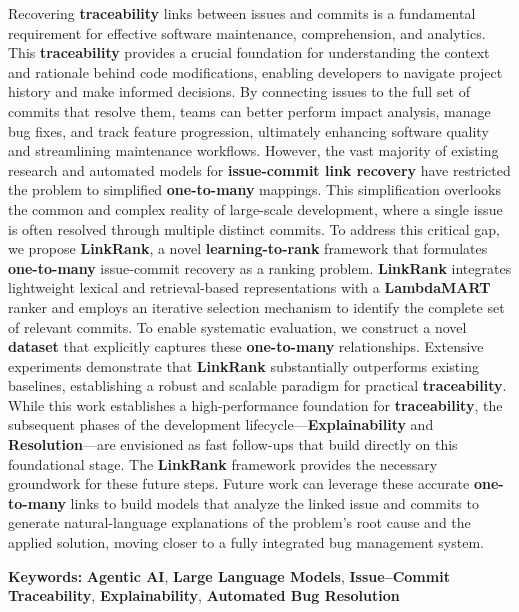 \documentclass[11pt,english,a4paper]{article}
\begin{document}
Recovering \textbf{traceability} links between issues and commits is a fundamental requirement for effective software maintenance, comprehension, and analytics. This \textbf{traceability} provides a crucial foundation for understanding the context and rationale behind code modifications, enabling developers to navigate project history and make informed decisions. By connecting issues to the full set of commits that resolve them, teams can better perform impact analysis, manage bug fixes, and track feature progression, ultimately enhancing software quality and streamlining maintenance workflows. However, the vast majority of existing research and automated models for \textbf{issue-commit link recovery} have restricted the problem to simplified \textbf{one-to-many} mappings. This simplification overlooks the common and complex reality of large-scale development, where a single issue is often resolved through multiple distinct commits. To address this critical gap, we propose \textbf{LinkRank}, a novel \textbf{learning-to-rank} framework that formulates \textbf{one-to-many} issue-commit recovery as a ranking problem. \textbf{LinkRank} integrates lightweight lexical and retrieval-based representations with a \textbf{LambdaMART} ranker and employs an iterative selection mechanism to identify the complete set of relevant commits. To enable systematic evaluation, we construct a novel \textbf{dataset} that explicitly captures these \textbf{one-to-many} relationships. Extensive experiments demonstrate that \textbf{LinkRank} substantially outperforms existing baselines, establishing a robust and scalable paradigm for practical \textbf{traceability}.\\

While this work establishes a high-performance foundation for \textbf{traceability}, the subsequent phases of the development lifecycle—\textbf{Explainability} and \textbf{Resolution}—are envisioned as fast follow-ups that build directly on this foundational stage. The \textbf{LinkRank} framework provides the necessary groundwork for these future steps. Future work can leverage these accurate \textbf{one-to-many} links to build models that analyze the linked issue and commits to generate natural-language explanations of the problem's root cause and the applied solution, moving closer to a fully integrated bug management system.\\
\vspace{0.2in}

\textbf{Keywords:} \textbf{Agentic AI}, \textbf{Large Language Models}, \textbf{Issue–Commit Traceability}, \textbf{Explainability}, \textbf{Automated Bug Resolution}

\newpage
\tableofcontents

\newpage
\listoffigures
\vspace{6pt}
\listoftables

\newpage




\newpage






\newpage


\end{document}
